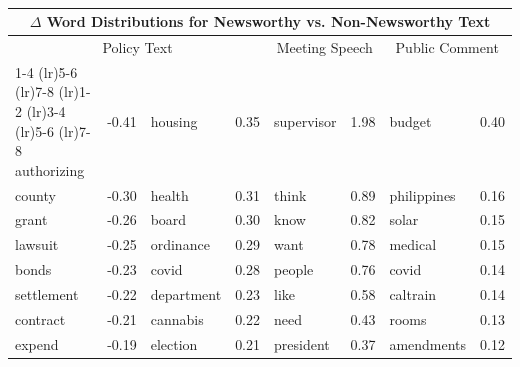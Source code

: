 \documentclass[11pt]{article}
\begin{document}
\begin{table}\
\centering
\begin{tabular}{llllllll}
\toprule
\multicolumn{8}{c}{$\Delta$ Word Distributions for Newsworthy vs. Non-Newsworthy Text} \\
\midrule
\multicolumn{4}{c}{Policy Text} & \multicolumn{2}{c}{Meeting Speech} & \multicolumn{2}{c}{Public Comment} \\ 
\cmidrule(lr){1-4} \cmidrule(lr){5-6} \cmidrule(lr){7-8}
\cmidrule(lr){1-2} \cmidrule(lr){3-4} \cmidrule(lr){5-6} \cmidrule(lr){7-8}
authorizing & \cellcolor{red!41} -0.41 &       housing & \cellcolor{blue!35} 0.35 & supervisor & \cellcolor{green!66} 1.98 &      budget &  \cellcolor{purple!40} 0.40 \\
     county &  \cellcolor{red!30} -0.30 &        health & \cellcolor{blue!31} 0.31 &      think & \cellcolor{green!29} 0.89 & philippines & \cellcolor{purple!16} 0.16 \\
      grant & \cellcolor{red!26} -0.26 &         board &  \cellcolor{blue!30} 0.30 &       know & \cellcolor{green!27} 0.82 &       solar & \cellcolor{purple!15} 0.15 \\
    lawsuit & \cellcolor{red!25} -0.25 &     ordinance & \cellcolor{blue!28} 0.29 &       want & \cellcolor{green!26} 0.78 &     medical & \cellcolor{purple!15} 0.15 \\
      bonds & \cellcolor{red!23} -0.23 &         covid & \cellcolor{blue!28} 0.28 &     people & \cellcolor{green!25} 0.76 &       covid & \cellcolor{purple!14} 0.14 \\
 settlement & \cellcolor{red!22} -0.22 &    department & \cellcolor{blue!23} 0.23 &       like & \cellcolor{green!19} 0.58 &    caltrain & \cellcolor{purple!14} 0.14 \\
   contract & \cellcolor{red!21} -0.21 &      cannabis & \cellcolor{blue!22} 0.22 &       need & \cellcolor{green!14} 0.43 &       rooms & \cellcolor{purple!13} 0.13 \\
     expend & \cellcolor{red!19} -0.19 &      election & \cellcolor{blue!21} 0.21 &  president & \cellcolor{green!12} 0.37 &  amendments & \cellcolor{purple!12} 0.12 \\

\end{tabular}
\end{table}
\end{document}
